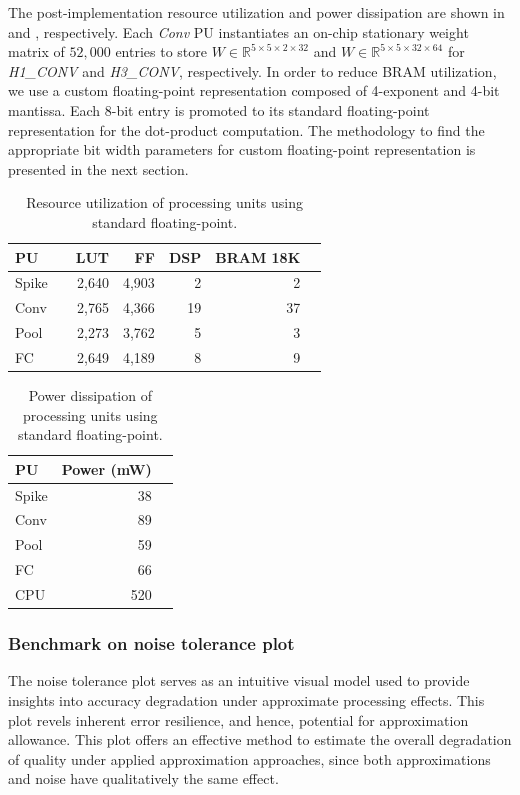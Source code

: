 The post-implementation resource utilization and power dissipation are shown in  and , respectively. Each \emph{Conv} PU instantiates an on-chip stationary weight matrix of $52,000$ entries to store $W\in\mathbb{R}^{5\times 5\times 2\times 32}$ and $W\in\mathbb{R}^{5\times 5\times 32\times 64}$ for \emph{H1\_CONV} and \emph{H3\_CONV}, respectively. In order to reduce BRAM utilization, we use a custom floating-point representation composed of 4-exponent and 4-bit mantissa. Each 8-bit entry is promoted to its standard floating-point representation for the dot-product computation. The methodology to find the appropriate bit width parameters for custom floating-point representation is presented in the next section.

\begin{table}[!h]\centering
	\caption{Resource utilization of processing units using standard floating-point.}\label{tab:resource_fp}
	\scriptsize
	\begin{tabular}{lrrrrrr}\toprule
		\textbf{PU} & &\textbf{LUT} &\textbf{FF} &\textbf{DSP} &\textbf{BRAM 18K} \\\midrule
		Spike & &2,640 &4,903 &2 &2 \\
		Conv & &2,765 &4,366 &19 &37 \\
		Pool & &2,273 &3,762 &5 &3 \\
		FC & &2,649 &4,189 &8 &9 \\
		\bottomrule
	\end{tabular}
\end{table}

\begin{table}[!h]\centering
	\caption{Power dissipation of processing units using standard floating-point.}\label{tab:power_fp}
	\scriptsize
	\begin{tabular}{lrr}\toprule
		\textbf{PU} &\textbf{Power (mW)} \\\midrule
		Spike &38 \\
		Conv &89 \\
		Pool &59 \\
		FC &66 \\
		CPU &520 \\
		\bottomrule
	\end{tabular}
\end{table}

\subsubsection{Benchmark on noise tolerance plot}
The noise tolerance plot serves as an intuitive visual model used to provide insights into accuracy degradation under approximate processing effects. This plot revels inherent error resilience, and hence, potential for approximation allowance. This plot offers an effective method to estimate the overall degradation of quality under applied approximation approaches, since both approximations and noise have qualitatively the same effect\cite{venkataramani2015approximate}.

